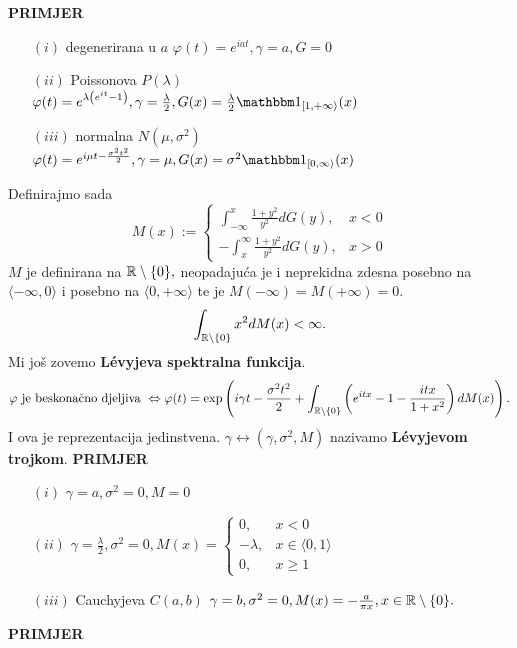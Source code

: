 \documentclass{article}
\begin{document}
\textbf{PRIMJER}
\begin{enumerate}
    \item[\((i)\)] degenerirana u \(a\) \(\varphi(t)=e^{iat},\gamma=a,G=0\)
    \item[\((ii)\)] Poissonova \(P(\lambda)\) \(\varphi(t)=e^{\lambda\left(e^{it}-1\right)},\gamma=\frac\lambda2,G(x)=\frac\lambda2\mathbbm 1_{[1,+\infty\rangle}(x)\)
    \item[\((iii)\)] normalna \(N(\mu,\sigma^2)\) \(\varphi(t)=e^{i\mu t-\frac{\sigma^2t^2}2},\gamma=\mu,G(x)=\sigma^2\mathbbm 1_{[0,\infty\rangle}(x)\)
\end{enumerate}
Definirajmo sada \[M(x):=\begin{cases}\int_{-\infty}^x\frac{1+y^2}{y^2}dG(y),&x<0\\-\int_x^\infty\frac{1+y^2}{y^2}dG(y),&x>0\end{cases}\] \(M\) je definirana na \(\Bbb R\setminus\{0\},\) neopadajuća je i neprekidna zdesna posebno na \(\langle-\infty,0\rangle\) i posebno na \(\langle0,+\infty\rangle\) te je \(M(-\infty)=M(+\infty)=0.\) \[\int_{\Bbb R\setminus\{0\}}x^2dM(x)<\infty.\] Mi još zovemo \textbf{L\'evyjeva spektralna funkcija}.
\[\varphi\text{ je beskonačno djeljiva }\Leftrightarrow\varphi(t)=\exp\left(i\gamma t-\frac{\sigma^2t^2}2+\int_{\Bbb R\setminus\{0\}}\left(e^{itx}-1-\frac{itx}{1+x^2}\right)dM(x)\right).\] I ova je reprezentacija jedinstvena. \(\gamma\leftrightarrow(\gamma,\sigma^2,M)\) nazivamo \textbf{L\'evyjevom trojkom}.\newline\newline
\textbf{PRIMJER}
\begin{enumerate}
    \item[\((i)\)] \(\gamma=a,\sigma^2=0,M=0\)
    \item[\((ii)\)] \(\gamma=\frac\lambda2,\sigma^2=0,M(x)=\begin{cases}0,&x<0\\-\lambda,&x\in\langle0,1\rangle\\0,&x\ge1\end{cases}\)
    \item[\((iii)\)] Cauchyjeva \(C(a,b)\) \(\gamma=b,\sigma^2=0,M(x)=-\frac{a}{\pi x},x\in\Bbb R\setminus\{0\}.\)
\end{enumerate}
\textbf{PRIMJER}\newline
\end{document}

